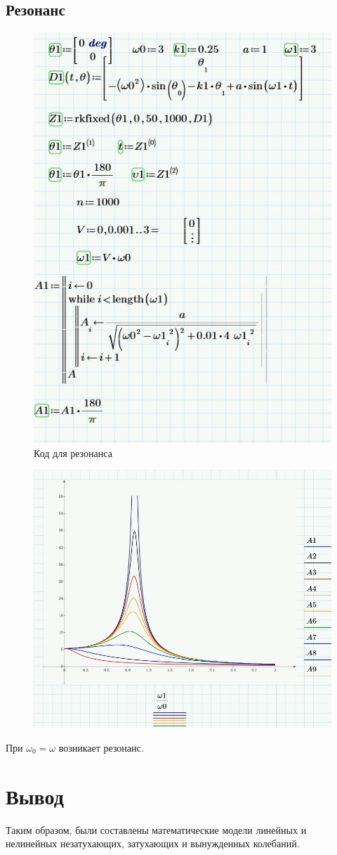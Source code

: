 \documentclass[a4paper, 14pt]{extarticle}
\begin{document}
		\subsection{Резонанс}
		\begin{figure}[H]
			\centering
			\includegraphics[width = .7\linewidth]{22.jpg}
			\caption[.] {Код для резонанса}
		\end{figure}	
		\begin{figure}[H]
			\centering
			\includegraphics[width = \linewidth]{18.jpg}
		\end{figure}
		При $\omega_0 = \omega$ возникает резонанс.
		
	\section{Вывод}
		Таким образом, были составлены математические модели линейных и нелинейных незатухающих, затухающих и вынужденных колебаний. 
		
\end{document}
